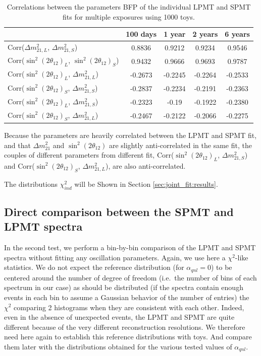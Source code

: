 \documentclass[../main.tex]{subfiles}
\begin{document}
\begin{table}
  \centering
  \begin{tabular}{l|c|c|c|c}
                                                                  & 100 days & 1 year & 2 years & 6 years \\
    \hline
    \hline
    Corr($\Delta m^2_{21,L}$,  $\Delta m^2_{21,S}$)               & 0.8836   & 0.9212 & 0.9234  & 0.9546 \\
    Corr($\sin^2(2\theta_{12})_{L}$, $\sin^2(2\theta_{12})_{S}$)  & 0.9432   & 0.9666 & 0.9693  & 0.9787 \\
    \hline
    Corr($\sin^2(2\theta_{12})_{L}$, $\Delta m^2_{21,L}$)         & -0.2673 & -0.2245 & -0.2264 & -0.2533 \\
    Corr($\sin^2(2\theta_{12})_{S}$, $\Delta m^2_{21,S}$)         & -0.2837 & -0.2234 & -0.2191 & -0.2363 \\
    \hline
    Corr($\sin^2(2\theta_{12})_{L}$, $\Delta m^2_{21,S}$)         & -0.2323 & -0.19   & -0.1922 & -0.2380 \\
    Corr($\sin^2(2\theta_{12})_{S}$, $\Delta m^2_{21,L}$)         & -0.2467 & -0.2122 & -0.2066 & -0.2275 \\
  \end{tabular}
  \caption{Correlations between the parameters BFP of the individual LPMT and SPMT fits for multiple exposures using 1000 toys.}
  \label{tab:joint_fit:ind_corr}
\end{table}

Because the parameters are heavily correlated between the LPMT and SPMT fit, and that $\Delta m^2_{21}$ and $\sin^2(2\theta_{12})$ are slightly anti-correlated in the same fit, the couples of different parameters from different fit, Corr($\sin^2(2\theta_{12})_{L}$, $\Delta m^2_{21,S}$) and Corr($\sin^2(2\theta_{12})_{S}$, $\Delta m^2_{21,L}$), are also anti-correlated.

The distributions $\chi^2_{ind}$ will be Shown in Section \ref{sec:joint_fit:results}.


\subsection{Direct comparison between the SPMT and LPMT spectra}
\label{sec:joint_fit:compar}

In the second test, we perform a bin-by-bin comparison of the LPMT and SPMT spectra without fitting any oscillation parameters.
Again, we use here a $\chi^2$-like statistics.
We do not expect the reference distribution (for $\alpha_{qnl}=0$) to be centered around the number of degree of freedom (i.e.\ the number of bins of each spectrum in our case) as should be distributed (if the spectra contain enough events in each bin to assume a Gaussian behavior of the number of entries) the $\chi^2$ comparing 2 histograms when they are consistent with each other. Indeed, even in the absence of unexpected events, the LPMT and SPMT are quite different because of the very different reconstruction resolutions. We therefore need here again to establish this reference distributions with toys. And compare them later with the distributions obtained for the various tested values of $\alpha_{qnl}$.
\end{document}
